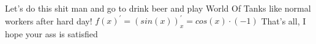 \documentclass{article}
\begin{document}
Let's do this shit man and go to drink beer and play World Of Tanks like normal workers after hard day!\newline \newline
$f(x)^\prime = ( sin( x))_{x}^\prime =  cos( x) \cdot (-1)
$ \newline \newline	That's all, I hope your ass is satisfied\newline
\end{document}
